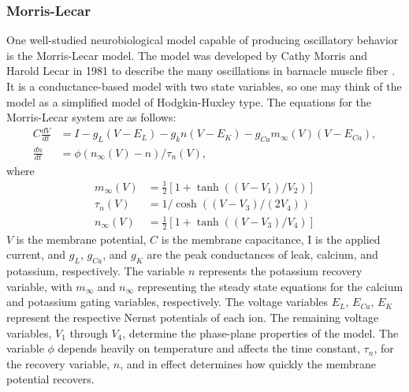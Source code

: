 \documentclass[12pt]{article}
\begin{document}
\subsubsection{Morris-Lecar}\label{app:morris-lecar}
One well-studied neurobiological model capable of producing oscillatory behavior is the Morris-Lecar model.  The model was developed by Cathy Morris and Harold Lecar in 1981 to describe the many oscillations in barnacle muscle fiber \cite{MorrisLecar:1981}.  It is a conductance-based model with two state variables, so one may think of the model as a simplified model of Hodgkin-Huxley type.  The equations for the Morris-Lecar system are as follows:
\begin{equation}
{\begin{array}{rl}
C \frac{dV}{dt}&=I-g_L(V-E_L)-g_k n (V-E_K) - g_{Ca} m_\infty (V)(V-E_{Ca}), \\
\frac{dn}{dt}&=\phi (n_\infty(V) - n)/\tau_n(V),
\end{array}}
\end{equation}
where
\begin{equation}
 \begin{split}
m_\infty(V) &= \frac{1}{2} \left [ 1 + \tanh((V-V_1)/V_2) \right]\\
\tau_n(V) &= 1/\cosh((V-V_3)/(2V_4))\\
n_\infty(V) &= \frac{1}{2}\left [ 1 + \tanh((V-V_3)/V_4) \right ]
 \end{split}
\end{equation}
$V$ is the membrane potential, $C$ is the membrane capacitance, I is the applied current, and $g_L$, $g_{Ca}$, and $g_K$ are the peak conductances of leak, calcium, and potassium, respectively.  The variable $n$ represents the potassium recovery variable, with $m_{\infty}$ and $n_{\infty}$ representing the steady state equations for the calcium and potassium gating variables, respectively.  The voltage variables $E_L$, $E_{Ca}$, $E_K$ represent the respective Nernst potentials of each ion.  The remaining voltage variables, $V_1$ through $V_4$, determine the phase-plane properties of the model.  The variable $\phi$ depends heavily on temperature and affects the time constant, $\tau_n$, for the recovery variable, $n$, and in effect determines how quickly the membrane potential recovers.

\end{document}
